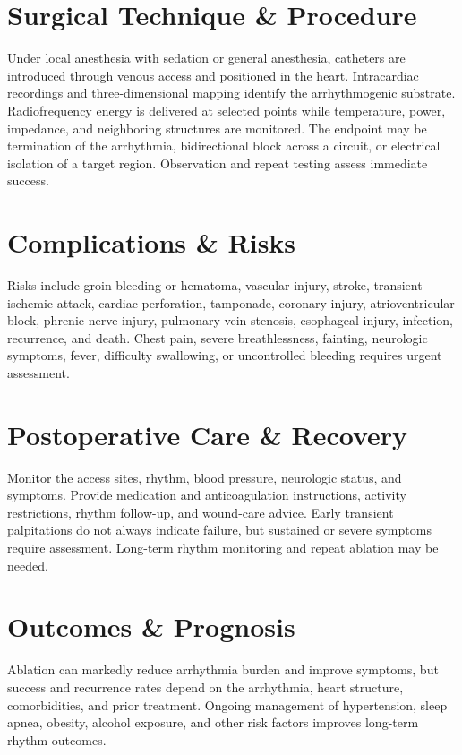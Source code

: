\section*{Surgical Technique \& Procedure}
Under local anesthesia with sedation or general anesthesia, catheters are introduced through venous access and positioned in the heart. Intracardiac recordings and three-dimensional mapping identify the arrhythmogenic substrate. Radiofrequency energy is delivered at selected points while temperature, power, impedance, and neighboring structures are monitored. The endpoint may be termination of the arrhythmia, bidirectional block across a circuit, or electrical isolation of a target region. Observation and repeat testing assess immediate success.

\section*{Complications \& Risks}
Risks include groin bleeding or hematoma, vascular injury, stroke, transient ischemic attack, cardiac perforation, tamponade, coronary injury, atrioventricular block, phrenic-nerve injury, pulmonary-vein stenosis, esophageal injury, infection, recurrence, and death. Chest pain, severe breathlessness, fainting, neurologic symptoms, fever, difficulty swallowing, or uncontrolled bleeding requires urgent assessment.

\section*{Postoperative Care \& Recovery}
Monitor the access sites, rhythm, blood pressure, neurologic status, and symptoms. Provide medication and anticoagulation instructions, activity restrictions, rhythm follow-up, and wound-care advice. Early transient palpitations do not always indicate failure, but sustained or severe symptoms require assessment. Long-term rhythm monitoring and repeat ablation may be needed.

\section*{Outcomes \& Prognosis}
Ablation can markedly reduce arrhythmia burden and improve symptoms, but success and recurrence rates depend on the arrhythmia, heart structure, comorbidities, and prior treatment. Ongoing management of hypertension, sleep apnea, obesity, alcohol exposure, and other risk factors improves long-term rhythm outcomes.

